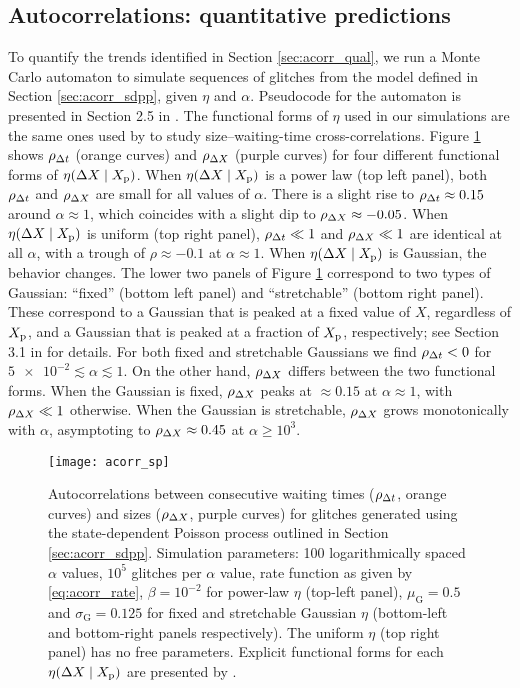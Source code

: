 \subsection{Autocorrelations: quantitative predictions}
\label{sec:acorr_quant}
To quantify the trends identified in Section \ref{sec:acorr_qual}, we run a Monte Carlo automaton to simulate sequences of glitches from the model defined in Section \ref{sec:acorr_sdpp}, given $\eta$ and $\alpha$. Pseudocode for the automaton is presented in Section 2.5 in \citet{Carlin2019quasi}. The functional forms of $\eta$ used in our simulations are the same ones used by \citet{Carlin2019quasi} to study size--waiting-time cross-correlations. Figure \ref{fig:acorr_sp} shows $\rho_{\Delta t}$ (orange curves) and $\rho_{\Delta X}$ (purple curves) for four different functional forms of $\eta(\Delta X \mid X_{\textrm{p}})$. When $\eta(\Delta X \mid X_{\textrm{p}})$ is a power law (top left panel), both $\rho_{\Delta t}$ and $\rho_{\Delta X}$ are small for all values of $\alpha$. There is a slight rise to $\rho_{\Delta t} \approx 0.15$ around $\alpha \approx 1$, which coincides with a slight dip to $\rho_{\Delta X} \approx -0.05$. When $\eta(\Delta X \mid X_{\textrm{p}})$ is uniform (top right panel), $\rho_{\Delta t} \ll 1$ and $\rho_{\Delta X} \ll 1$ are identical at all $\alpha$, with a trough of $\rho \approx -0.1$ at $\alpha \approx 1$. When $\eta(\Delta X \mid X_{\textrm{p}})$ is Gaussian, the behavior changes. The lower two panels of Figure \ref{fig:acorr_sp} correspond to two types of Gaussian: ``fixed'' (bottom left panel) and ``stretchable'' (bottom right panel). These correspond to a Gaussian that is peaked at a fixed value of $X$, regardless of $X_{\textrm{p}}$, and a Gaussian that is peaked at a fraction of $X_{\textrm{p}}$, respectively; see Section 3.1 in \citet{Carlin2019quasi} for details. For both fixed and stretchable Gaussians we find $\rho_{\Delta t} < 0$ for $\num{5e-2} \lesssim \alpha \lesssim 1$. On the other hand, $\rho_{\Delta X}$ differs between the two functional forms. When the Gaussian is fixed, $\rho_{\Delta X}$ peaks at $\approx 0.15$ at $\alpha \approx 1$, with $\rho_{\Delta X} \ll 1$ otherwise. When the Gaussian is stretchable, $\rho_{\Delta X}$ grows monotonically with $\alpha$, asymptoting to $\rho_{\Delta X} \approx 0.45$ at $\alpha \geq 10^3$.

\begin{figure}
	\centering
	\texttt{[image: acorr\_sp]}
	\caption{Autocorrelations between consecutive waiting times ($\rho_{\Delta t}$, orange curves) and sizes ($\rho_{\Delta X}$, purple curves) for glitches generated using the state-dependent Poisson process outlined in Section \ref{sec:acorr_sdpp}. Simulation parameters: 100 logarithmically spaced $\alpha$ values, $10^5$ glitches per $\alpha$ value, rate function as given by \eqref{eq:acorr_rate}, $\beta=10^{-2}$ for power-law $\eta$ (top-left panel), $\mu_\textrm{G}=0.5$ and $\sigma_\textrm{G}=0.125$ for fixed and stretchable Gaussian $\eta$ (bottom-left and bottom-right panels respectively). The uniform $\eta$ (top right panel) has no free parameters. Explicit functional forms for each $\eta(\Delta X \mid X_{\textrm{p}})$ are presented by \citet[Table 1]{Carlin2019quasi}.}
	\label{fig:acorr_sp}
\end{figure}

